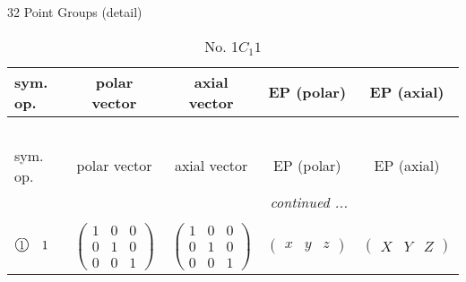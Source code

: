 \documentclass[fleqn,10pt,landscape]{jsarticle}
\begin{document}
\setcounter{MaxMatrixCols}{16}

\begin{center}
\LARGE
32 Point Groups (detail)
\end{center}
\begin{center}
\renewcommand{\arraystretch}{1.3}
\begin{longtable}{lcccc}
\caption{No. 1\quad$C_{1}$\quad$1$\quad[ triclinic ]}
 \\
 \hline \hline
sym. op. & polar vector & axial vector & EP (polar) & EP (axial) \\ \hline \endfirsthead

\multicolumn{4}{l}{\tablename\ \thetable{}} \\
 \hline \hline
sym. op. & polar vector & axial vector & EP (polar) & EP (axial) \\ \hline \endhead

 \hline \hline
\multicolumn{4}{r}{\footnotesize\it continued ...} \\ \endfoot

 \hline \hline
\multicolumn{4}{r}{} \\ \endlastfoot

$ {\ooalign{\hfil\resizebox{.8\width}{\height}{1}\hfil\crcr\raise.1ex\hbox{\large$\bigcirc$}}}\quad 1 $ & $ \begin{pmatrix} 1 & 0 & 0 \\ 0 & 1 & 0 \\ 0 & 0 & 1 \end{pmatrix} $ & $ \begin{pmatrix} 1 & 0 & 0 \\ 0 & 1 & 0 \\ 0 & 0 & 1 \end{pmatrix} $ & $ \begin{pmatrix} x & y & z \end{pmatrix} $ & $ \begin{pmatrix} X & Y & Z \end{pmatrix} $ \\
\end{longtable}
\end{center}
\newpage
\end{document}
